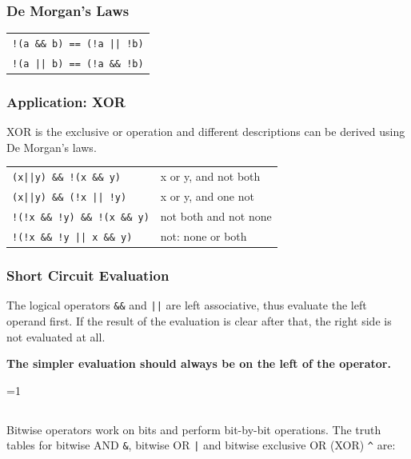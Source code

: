 \documentclass[10pt,a4paper]{scrartcl}
\gdef\conditionmacro{0}
\begin{document}
\begin{multicols*}{2}
\subsubsection{De Morgan's Laws}
\label{sec:DeMorgansLaws}

\begin{center}
\begin{tabular}{l}
\verb+!(a && b) == (!a || !b)+\\
\verb+!(a || b) == (!a && !b)+
\end{tabular}
\end{center}

\subsubsection{Application: XOR}
\label{sec:ApplicationsXOR}

XOR is the exclusive or operation and different descriptions can be derived using De Morgan's laws.

\begin{center}
\begin{tabular}{ll}
\verb+(x||y) && !(x && y)+&x or y, and not both\\
\verb+(x||y) && (!x || !y)+&x or y, and one not\\
\verb+!(!x && !y) && !(x && y)+& not both and not none\\
\verb+!(!x && !y || x && y)+& not: none or both
\end{tabular}
\end{center}

\subsubsection{Short Circuit Evaluation}
\label{sec:ShortCircuitEvaluation}

The logical operators \verb+&&+ and \verb+||+ are left associative, thus evaluate the left operand first. If the result of the evaluation is clear after that, the right side is not evaluated at all. 

\textbf{The simpler evaluation should always be on the left of the operator.}

\ifnum\conditionmacro=1
\subsection{}
\label{sec:BitwiseOperators}

Bitwise operators work on bits and perform bit-by-bit operations. The truth tables for bitwise AND \verb.&., bitwise OR \verb.|. and bitwise exclusive OR (XOR) \verb.^. are:


\end{multicols*}
\end{document}
